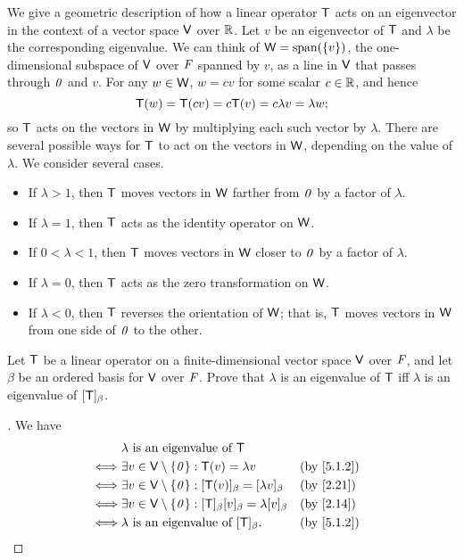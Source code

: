 \begin{note}
  We give a geometric description of how a linear operator \(\mathsf{T}\) acts on an eigenvector in the context of a vector space \(\mathsf{V}\) over \(\mathbb{R}\).
  Let \(v\) be an eigenvector of \(\mathsf{T}\) and \(\lambda\) be the corresponding eigenvalue.
  We can think of \(\W = \spn{\set{v}}\), the one-dimensional subspace of \(\mathsf{V}\) over \(\mathit{F}\) spanned by \(v\), as a line in \(\mathsf{V}\) that passes through \(\mathit{0}\) and \(v\).
  For any \(w \in \mathsf{W}\), \(w = cv\) for some scalar \(c \in \mathbb{R}\), and hence
  \[
    \mathsf{T}(w) = \mathsf{T}(cv) = c \mathsf{T}(v) = c \lambda v = \lambda w;
  \]
  so \(\mathsf{T}\) acts on the vectors in \(\mathsf{W}\) by multiplying each such vector by \(\lambda\).
  There are several possible ways for \(\mathsf{T}\) to act on the vectors in \(\mathsf{W}\), depending on the value of \(\lambda\).
  We consider several cases.
  \begin{itemize}
    \item If \(\lambda > 1\), then \(\mathsf{T}\) moves vectors in \(\mathsf{W}\) farther from \(\mathit{0}\) by a factor of \(\lambda\).
    \item If \(\lambda = 1\), then \(\mathsf{T}\) acts as the identity operator on \(\mathsf{W}\).
    \item If \(0 < \lambda < 1\), then \(\mathsf{T}\) moves vectors in \(\mathsf{W}\) closer to \(\mathit{0}\) by a factor of \(\lambda\).
    \item If \(\lambda = 0\), then \(\mathsf{T}\) acts as the zero transformation on \(\mathsf{W}\).
    \item If \(\lambda < 0\), then \(\mathsf{T}\) reverses the orientation of \(\mathsf{W}\);
          that is, \(\mathsf{T}\) moves vectors in \(\mathsf{W}\) from one side of \(\mathit{0}\) to the other.
  \end{itemize}
\end{note}

\exercisesection

\setcounter{ex}{5}
\begin{ex}\label{ex:5.1.6}
  Let \(\mathsf{T}\) be a linear operator on a finite-dimensional vector space \(\mathsf{V}\) over \(\mathit{F}\), and let \(\beta\) be an ordered basis for \(\mathsf{V}\) over \(\mathit{F}\).
  Prove that \(\lambda\) is an eigenvalue of \(\mathsf{T}\) iff \(\lambda\) is an eigenvalue of \([\mathsf{T}]_{\beta}\).
\end{ex}

\begin{proof}[]
  We have
  \begin{align*}
         & \lambda \text{ is an eigenvalue of } \T                                                                             \\
    \iff & \exists v \in \V \setminus \set{\zv} : \T(v) = \lambda v                              &  & \text{(by \cref{5.1.2})} \\
    \iff & \exists v \in \V \setminus \set{\zv} : [\T(v)]_{\beta} = [\lambda v]_{\beta}          &  & \text{(by \cref{2.21})}  \\
    \iff & \exists v \in \V \setminus \set{\zv} : [\T]_{\beta} [v]_{\beta} = \lambda [v]_{\beta} &  & \text{(by \cref{2.14})}  \\
    \iff & \lambda \text{ is an eigenvalue of } [\T]_{\beta}.                                    &  & \text{(by \cref{5.1.2})}
  \end{align*}
\end{proof}

